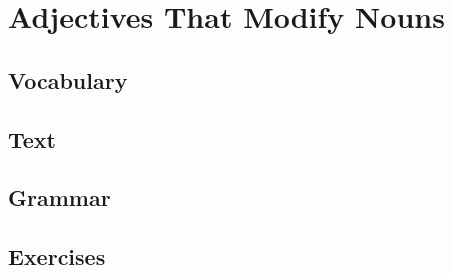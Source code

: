 \chapter{Adjectives That Modify Nouns}
\section*{Vocabulary}
\section*{Text}
\section*{Grammar}
\section*{Exercises}
